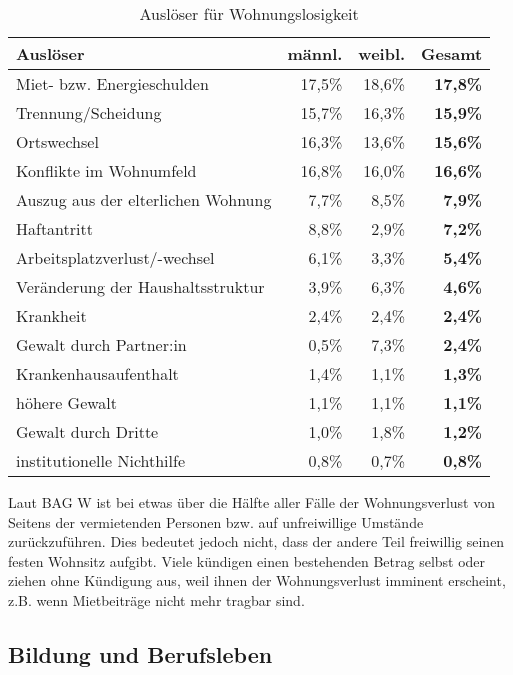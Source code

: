 \begin{table}[ht]
	\centering
	\begin{tabulary}{\textwidth}{LRRR}
		\toprule
		Auslöser&							männl.&	weibl.&	\textbf{Gesamt}\\
		\midrule
		Miet- bzw. Energieschulden&			17,5\%&	18,6\%&	\textbf{17,8\%}\\
		Trennung/Scheidung&					15,7\%&	16,3\%&	\textbf{15,9\%}\\
		Ortswechsel&						16,3\%&	13,6\%&	\textbf{15,6\%}\\
		Konflikte im Wohnumfeld&			16,8\%&	16,0\%&	\textbf{16,6\%}\\
		Auszug aus der elterlichen Wohnung&	7,7\%&	8,5\%&	\textbf{7,9\%}\\
		Haftantritt&						8,8\%&	2,9\%&	\textbf{7,2\%}\\
		Arbeitsplatzverlust/-wechsel&		6,1\%&	3,3\%&	\textbf{5,4\%}\\
		Veränderung der Haushaltsstruktur&	3,9\%&	6,3\%&	\textbf{4,6\%}\\
		Krankheit&							2,4\%&	2,4\%&	\textbf{2,4\%}\\
		Gewalt durch Partner:in&			0,5\%&	7,3\%&	\textbf{2,4\%}\\
		Krankenhausaufenthalt&				1,4\%&	1,1\%&	\textbf{1,3\%}\\
		höhere Gewalt&						1,1\%&	1,1\%&	\textbf{1,1\%}\\
		Gewalt durch Dritte&				1,0\%&	1,8\%&	\textbf{1,2\%}\\
		institutionelle Nichthilfe&			0,8\%&	0,7\%&	\textbf{0,8\%}\\
		\bottomrule
	\end{tabulary}
	\caption[Auslöser für Wohnungslosigkeit]{Auslöser für Wohnungslosigkeit \citep{BAGW.2022}}
	\label{tab:gruende}
\end{table}

Laut \ac{BAG W} ist bei etwas über die Hälfte aller Fälle der Wohnungsverlust von Seitens der vermietenden Personen bzw. auf unfreiwillige Umstände zurückzuführen. Dies bedeutet jedoch nicht, dass der andere Teil freiwillig seinen festen Wohnsitz aufgibt. Viele kündigen einen bestehenden Betrag selbst oder ziehen ohne Kündigung aus, weil ihnen der Wohnungsverlust imminent erscheint, z.B. wenn Mietbeiträge nicht mehr tragbar sind.

\subsection{Bildung und Berufsleben}

